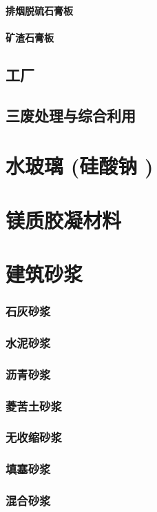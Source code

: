 \documentclass[UTF8]{../../ApplicationUniverse}
\begin{document}
            \paragraph{排烟脱硫石膏板}
            \paragraph{矿渣石膏板}
    \subsection{工厂}
    \subsection{三废处理与综合利用}
\section{水玻璃 (硅酸钠 )}
\section{镁质胶凝材料}
\section{建筑砂浆}
    \subsubsection{石灰砂浆}
    \subsubsection{水泥砂浆}
    \subsubsection{沥青砂浆}
    \subsubsection{菱苦土砂浆}
    \subsubsection{无收缩砂浆}
    \subsubsection{填塞砂浆}
    \subsubsection{混合砂浆}
\end{document}
